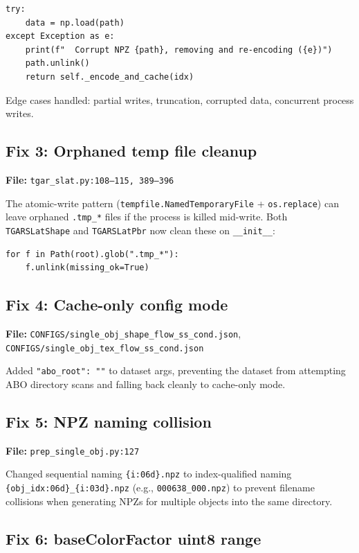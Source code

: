 \begin{lstlisting}
try:
    data = np.load(path)
except Exception as e:
    print(f"  Corrupt NPZ {path}, removing and re-encoding ({e})")
    path.unlink()
    return self._encode_and_cache(idx)
\end{lstlisting}

Edge cases handled: partial writes, truncation, corrupted data, concurrent
process writes.

\subsection{Fix 3: Orphaned temp file cleanup}

\textbf{File:} \texttt{tgar\_slat.py:108--115, 389--396}

The atomic-write pattern (\texttt{tempfile.NamedTemporaryFile} +
\texttt{os.replace}) can leave orphaned \texttt{.tmp\_*} files if the
process is killed mid-write. Both \texttt{TGARSLatShape} and
\texttt{TGARSLatPbr} now clean these on \texttt{\_\_init\_\_}:

\begin{lstlisting}
for f in Path(root).glob(".tmp_*"):
    f.unlink(missing_ok=True)
\end{lstlisting}

\subsection{Fix 4: Cache-only config mode}

\textbf{File:} \texttt{CONFIGS/single\_obj\_shape\_flow\_ss\_cond.json},
\texttt{CONFIGS/single\_obj\_tex\_flow\_ss\_cond.json}

Added \texttt{"abo\_root": ""} to dataset args, preventing the dataset from
attempting ABO directory scans and falling back cleanly to cache-only mode.

\subsection{Fix 5: NPZ naming collision}

\textbf{File:} \texttt{prep\_single\_obj.py:127}

Changed sequential naming \texttt{\{i:06d\}.npz} to index-qualified naming
\texttt{\{obj\_idx:06d\}\_\{i:03d\}.npz} (e.g.,
\texttt{000638\_000.npz}) to prevent filename collisions when generating
NPZs for multiple objects into the same directory.

\subsection{Fix 6: baseColorFactor uint8 range}

